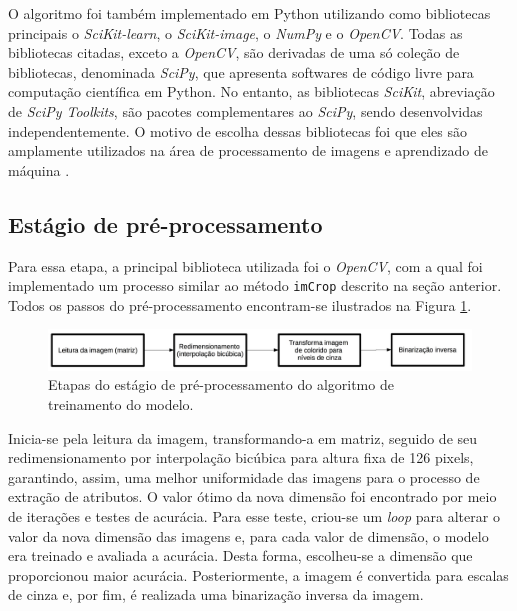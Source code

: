 O algoritmo foi também implementado em Python utilizando como bibliotecas principais o \textit{SciKit-learn}, o \textit{SciKit-image}, o \textit{NumPy} e o \textit{OpenCV}. Todas as bibliotecas citadas, exceto a \textit{OpenCV}, são derivadas de uma só coleção de bibliotecas, denominada \textit{SciPy}, que apresenta softwares de código livre para computação científica em Python. No entanto, as bibliotecas \textit{SciKit}, abreviação de \textit{SciPy Toolkits}, são pacotes complementares ao \textit{SciPy}, sendo desenvolvidas independentemente. O motivo de escolha dessas bibliotecas foi que eles são amplamente utilizados na área de processamento de imagens e aprendizado de máquina     .

\subsection{Estágio de pré-processamento}

Para essa etapa, a principal biblioteca utilizada foi o  \textit{OpenCV}, com a qual foi implementado um processo similar ao método \texttt{imCrop} descrito na seção anterior. Todos os passos do pré-processamento encontram-se ilustrados na Figura \ref{fig:flowpreProc}.

\begin{figure}[h!]
  \centering
  \includegraphics[width=1\linewidth]{figuras/preprocess.pdf}
  \caption{Etapas do estágio de pré-processamento do algoritmo de treinamento do modelo.}
  \label{fig:flowpreProc}
\end{figure}

Inicia-se pela leitura da imagem, transformando-a em matriz, seguido de seu redimensionamento por interpolação bicúbica para altura fixa de 126 pixels, garantindo, assim, uma melhor uniformidade das imagens para o processo de extração de atributos. O valor ótimo da nova dimensão foi encontrado por meio de iterações e testes de acurácia. Para esse teste, criou-se um \textit{loop} para alterar o valor da nova dimensão das imagens e, para cada valor de dimensão, o modelo era treinado e avaliada a acurácia. Desta forma, escolheu-se a dimensão que proporcionou maior acurácia. Posteriormente, a imagem é convertida para escalas de cinza e, por fim, é realizada uma binarização inversa da imagem.

